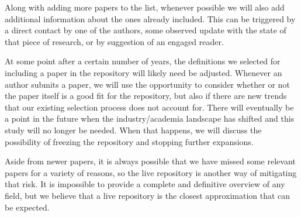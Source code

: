 Along with adding more papers to the list, whenever possible we will also add additional information about the ones already included.
This can be triggered by a direct contact by one of the authors, some observed update with the state of that piece of research, or by suggestion of an engaged reader.

At some point after a certain number of years, the definitions we selected for including a paper in the repository will likely need be adjusted.
Whenever an author submits a paper, we will use the opportunity to consider whether or not the paper itself is a good fit for the repository, but also if there are new trends that our existing selection process does not account for.
There will eventually be a point in the future when the industry/academia landscape has shifted and this study will no longer be needed.
When that happens, we will discuss the possibility of freezing the repository and stopping further expansions.

Aside from newer papers, it is always possible that we have missed some relevant papers for a variety of reasons, so the live repository is another way of mitigating that risk.
It is impossible to provide a complete and definitive overview of any field, but we believe that a live repository is the closest approximation that can be expected.


